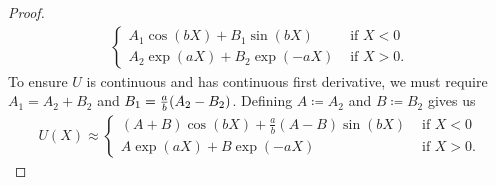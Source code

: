 \documentclass{article} %
\theoremstyle{plain}
\numberwithin{equation}{section} %
\numberwithin{figure}{section} %
\numberwithin{table}{section} %
\begin{document}
\begin{proof}
\begin{align*}
\begin{cases}
            A_1 \cos(bX) + B_1 \sin(bX) & \text{ if } X < 0\\
            A_2 \exp(aX) + B_2 \exp(-aX) & \text{ if } X > 0.
        \end{cases}
    \end{align*}
    To ensure $U$ is continuous and has continuous first derivative, we must require $A_1 = A_2 + B_2$ and $B_1 = \frac{a}{b}\qty(A_2 - B_2)$.  Defining $A \coloneqq A_2$ and $B \coloneqq B_2$ gives us
    \begin{align*}
        U(X) \approx \begin{cases}
            (A + B) \cos(bX) + \frac{a}{b}(A - B) \sin(bX) & \text{ if } X < 0\\
            A \exp(aX) + B \exp(-aX) & \text{ if } X > 0.
        \end{cases}
    \end{align*}
\end{proof}
\end{document}
